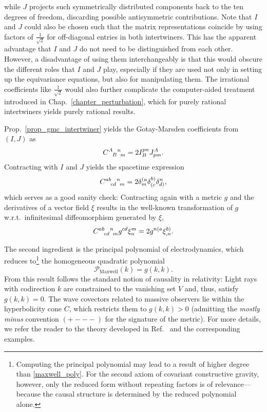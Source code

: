 while $J$ projects such symmetrically distributed components back to the ten degrees of freedom, discarding possible antisymmetric contributions. Note that $I$ and $J$ could also be chosen such that the matrix representations coincide by using factors of $\frac{1}{\sqrt 2}$ for off-diagonal entries in both intertwiners. This has the apparent advantage that $I$ and $J$ do not need to be distinguished from each other. However, a disadvantage of using them interchangeably is that this would obscure the different roles that $I$ and $J$ play, especially if they are used not only in setting up the equivariance equations, but also for manipulating them. The irrational coefficients like $\frac{1}{\sqrt 2}$ would also further complicate the computer-aided treatment introduced in Chap.~\ref{chapter_perturbation}, which for purely rational intertwiners yields purely rational results.

Prop.~\ref{prop_gmc_intertwiner} yields the Gotay-Marsden coefficients from $(I,J)$ as
\begin{equation}
  \gmc{A}{B}{n}{m} = 2 I^{pn}_B J^A_{pm}.
\end{equation}
Contracting with $I$ and $J$ yields the spacetime expression
\begin{equation}
  \gmc{ab}{cd}{n}{m} = 2 \delta^{(a}_m \delta^{b)}_{(c} \delta^n_{d)},
\end{equation}
which serves as a good sanity check: Contracting again with a metric $g$ and the derivatives of a vector field $\xi$ results in the well-known transformation of $g$ w.r.t.~infinitesimal diffeomorphism generated by $\xi$,
\begin{equation}
  \gmc{ab}{cd}{n}{m} g^{cd} \xi^m_n = 2g^{n(a} \xi^{b)}_{,n}.
\end{equation}

The second ingredient is the principal polynomial of electrodynamics, which reduces to\footnote{Computing the principal polynomial may lead to a result of higher degree than \eqref{maxwell_poly}. For the second axiom of covariant constructive gravity, however, only the reduced form without repeating factors is of relevance---because the causal structure is determined by the reduced polynomial alone\cite{sergio}.} the homogeneous quadratic polynomial\cite{sergio?}
\begin{equation}\label{maxwell_poly}
  \mathcal P_\text{Maxwell}(k) = g(k,k).
\end{equation}
From this result follows the standard notion of causality in relativity: Light rays with codirection $k$ are constrained to the vanishing set $V$ and, thus, satisfy $g(k,k)=0$. The wave covectors related to massive observers lie within the hyperbolicity cone $C$, which restricts them to $g(k,k) > 0$ (admitting the \emph{mostly minus} convention $(+---)$ for the signature of the metric). For more details, we refer the reader to the theory developed in Ref.~\cite{sergio,closure paper,?} and the corresponding examples.

